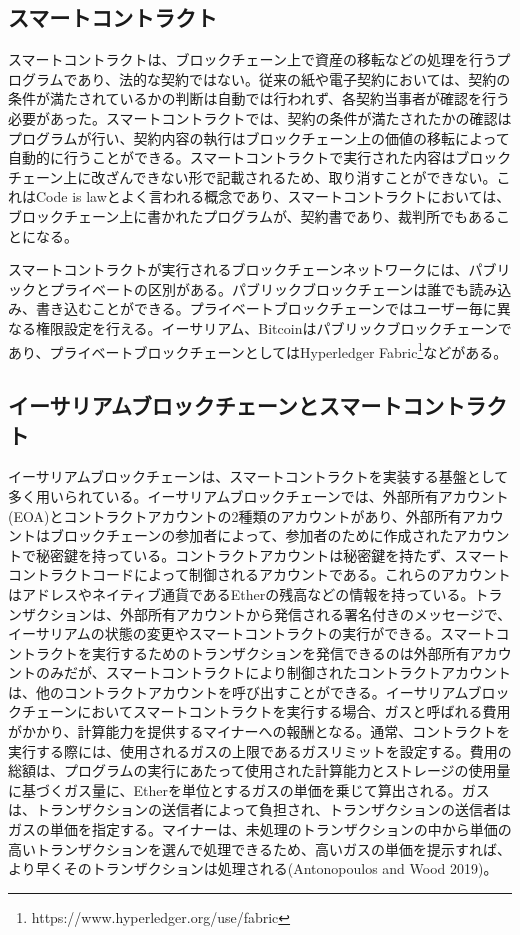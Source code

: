 \documentclass[a4paper,fontsize=11pt,report,notitlepage,line_length=38zw,number_of_lines=40,dvipdfmx]{jlreq}
\begin{document}
\subsection{スマートコントラクト}
スマートコントラクトは、ブロックチェーン上で資産の移転などの処理を行うプログラムであり、法的な契約ではない。従来の紙や電子契約においては、契約の条件が満たされているかの判断は自動では行われず、各契約当事者が確認を行う必要があった。スマートコントラクトでは、契約の条件が満たされたかの確認はプログラムが行い、契約内容の執行はブロックチェーン上の価値の移転によって自動的に行うことができる。スマートコントラクトで実行された内容はブロックチェーン上に改ざんできない形で記載されるため、取り消すことができない。これはCode is lawとよく言われる概念であり、スマートコントラクトにおいては、ブロックチェーン上に書かれたプログラムが、契約書であり、裁判所でもあることになる\cite{nagasawa2013}。

スマートコントラクトが実行されるブロックチェーンネットワークには、パブリックとプライベートの区別がある。パブリックブロックチェーンは誰でも読み込み、書き込むことができる。プライベートブロックチェーンではユーザー毎に異なる権限設定を行える。イーサリアム、Bitcoinはパブリックブロックチェーンであり、プライベートブロックチェーンとしてはHyperledger Fabric\footnote{https://www.hyperledger.org/use/fabric}などがある。

\subsection{イーサリアムブロックチェーンとスマートコントラクト}
イーサリアムブロックチェーンは、スマートコントラクトを実装する基盤として多く用いられている。イーサリアムブロックチェーンでは、外部所有アカウント(EOA)とコントラクトアカウントの2種類のアカウントがあり、外部所有アカウントはブロックチェーンの参加者によって、参加者のために作成されたアカウントで秘密鍵を持っている。コントラクトアカウントは秘密鍵を持たず、スマートコントラクトコードによって制御されるアカウントである。これらのアカウントはアドレスやネイティブ通貨であるEtherの残高などの情報を持っている。トランザクションは、外部所有アカウントから発信される署名付きのメッセージで、イーサリアムの状態の変更やスマートコントラクトの実行ができる。スマートコントラクトを実行するためのトランザクションを発信できるのは外部所有アカウントのみだが、スマートコントラクトにより制御されたコントラクトアカウントは、他のコントラクトアカウントを呼び出すことができる。イーサリアムブロックチェーンにおいてスマートコントラクトを実行する場合、ガスと呼ばれる費用がかかり、計算能力を提供するマイナーへの報酬となる。通常、コントラクトを実行する際には、使用されるガスの上限であるガスリミットを設定する。費用の総額は、プログラムの実行にあたって使用された計算能力とストレージの使用量に基づくガス量に、Etherを単位とするガスの単価を乗じて算出される。ガスは、トランザクションの送信者によって負担され、トランザクションの送信者はガスの単価を指定する。マイナーは、未処理のトランザクションの中から単価の高いトランザクションを選んで処理できるため、高いガスの単価を提示すれば、より早くそのトランザクションは処理される(Antonopoulos and Wood 2019)\cite{antonopoulos2019}。
\end{document}
